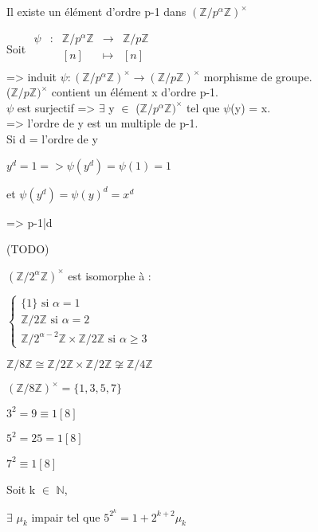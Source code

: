 \begin{prop}
	Il existe un élément d'ordre p-1 dans $(\mathbb{Z}/p^{\alpha}\mathbb{Z})^{\times}$
\end{prop}
\begin{dem}
	Soit 
	$\begin{array}{ccccc}
		\psi & : & \mathbb{Z}/ p^{\alpha}\mathbb{Z} & \to &  \mathbb{Z}/p\mathbb{Z} \\
		& & [n] & \mapsto & [n] \\
	\end{array}$\\ 
=> induit $\psi:(\mathbb{Z}/ p^{\alpha}\mathbb{Z})^{\times} \to (\mathbb{Z}/p\mathbb{Z})^{\times}$ morphisme de groupe.\\
($\mathbb{Z}/p\mathbb{Z})^{\times}$ contient un élément x d'ordre p-1.\\
$\psi$ est surjectif => $\exists$ y $\in$ ($\mathbb{Z}/p^{\alpha}\mathbb{Z})^{\times}$ tel que $\psi$(y) = x.\\
=> l'ordre de y est un multiple de p-1.\\
Si d = l'ordre de y

$y^{d} = 1 => \psi(y^{d}) = \psi(1) = 1$

et $\psi(y^{d}) = \psi(y)^{d} =x^d$

=> p-1|d

(TODO)
\end{dem}
\begin{prop}
	$(\mathbb{Z}/2^{\alpha}\mathbb{Z})^{\times}$ est isomorphe à :
	
	$\left\{
	\begin{array}{ll}
		\{1\} \mbox{ si } \alpha = 1 \\
		\mathbb{Z}/2\mathbb{Z} \mbox{ si } \alpha =2 \\
		\mathbb{Z}/2^{\alpha-2}\mathbb{Z} \times \mathbb{Z}/2\mathbb{Z} \mbox{ si } \alpha \geq3
	\end{array}
	\right.$
\end{prop}
\begin{ex}
	$\mathbb{Z}/8\mathbb{Z} \cong \mathbb{Z}/2\mathbb{Z} \times \mathbb{Z}/2\mathbb{Z} \not\cong \mathbb{Z}/4\mathbb{Z}$
	
	$(\mathbb{Z}/8\mathbb{Z})^{\times} = \{1,3, 5, 7\}$
	
	$3^{2} = 9 \equiv 1[8]$
	
	$5^2 = 25 = 1[8]$
	
	$7^2 \equiv 1[8]$
\end{ex}
\begin{lem}
	Soit k $\in$ $\mathbb{N}$, 
	
	$\exists$ $\mu_{k}$ impair tel que $5^{2^{k}} = 1 + 2^{k+2}\mu_{k}$\\
\end{lem}
